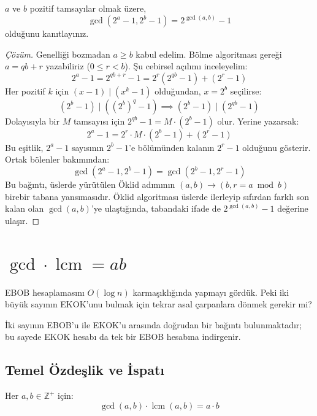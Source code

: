\begin{example}
$a$ ve $b$ pozitif tamsayılar olmak üzere,
\[ \gcd(2^a - 1, 2^b - 1) = 2^{\gcd(a, b)} - 1 \]
olduğunu kanıtlayınız.
\end{example}

\begin{proof}[Çözüm]
Genelliği bozmadan $a \ge b$ kabul edelim. Bölme algoritması gereği $a = qb + r$ yazabiliriz ($0 \le r < b$).
Şu cebirsel açılımı inceleyelim:
\[ 2^a - 1 = 2^{qb + r} - 1 = 2^r (2^{qb} - 1) + (2^r - 1) \]
Her pozitif $k$ için $(x - 1) \mid (x^k - 1)$ olduğundan, $x = 2^b$ seçilirse:
\[ (2^b - 1) \mid ((2^b)^q - 1) \implies (2^b - 1) \mid (2^{qb} - 1) \]
Dolayısıyla bir $M$ tamsayısı için $2^{qb} - 1 = M \cdot (2^b - 1)$ olur. Yerine yazarsak:
\[ 2^a - 1 = 2^r \cdot M \cdot (2^b - 1) + (2^r - 1) \]
Bu eşitlik, $2^a - 1$ sayısının $2^b - 1$'e bölümünden kalanın $2^r - 1$ olduğunu gösterir. Ortak bölenler bakımından:
\[ \gcd(2^a - 1, 2^b - 1) = \gcd(2^b - 1, 2^r - 1) \]
Bu bağıntı, üslerde yürütülen Öklid adımının $(a, b) \to (b, r = a \bmod b)$ birebir tabana yansımasıdır.
Öklid algoritması üslerde ilerleyip sıfırdan farklı son kalan olan $\gcd(a, b)$'ye ulaştığında, tabandaki ifade de $2^{\gcd(a, b)} - 1$ değerine ulaşır.
\end{proof}

\section{\texorpdfstring{$\gcd \cdot \operatorname{lcm} = ab$}{gcd . lcm = ab}}

EBOB hesaplamasını $O(\log n)$ karmaşıklığında yapmayı gördük. Peki iki büyük sayının EKOK'unu bulmak için tekrar asal çarpanlara dönmek gerekir mi?

İki sayının EBOB'u ile EKOK'u arasında doğrudan bir bağıntı bulunmaktadır; bu sayede EKOK hesabı da tek bir EBOB hesabına indirgenir.

\subsection*{Temel Özdeşlik ve İspatı}

\begin{theorem}
Her $a, b \in \mathbb{Z}^+$ için:
\[ \gcd(a, b) \cdot \operatorname{lcm}(a, b) = a \cdot b \]
\end{theorem}

